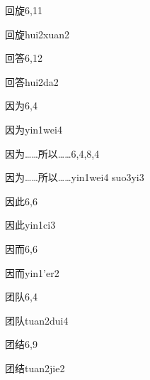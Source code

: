 \begin{entry}{回旋}{6,11}
  \begin{phonetics}{回旋}{hui2xuan2}
  \end{phonetics}
\end{entry}

\begin{entry}{回答}{6,12}
  \begin{phonetics}{回答}{hui2da2}
  \end{phonetics}
\end{entry}

\begin{entry}{因为}{6,4}
  \begin{phonetics}{因为}{yin1wei4}
  \end{phonetics}
\end{entry}

\begin{entry}{因为……所以……}{6,4,8,4}
  \begin{phonetics}{因为……所以……}{yin1wei4 suo3yi3}
  \end{phonetics}
\end{entry}

\begin{entry}{因此}{6,6}
  \begin{phonetics}{因此}{yin1ci3}
  \end{phonetics}
\end{entry}

\begin{entry}{因而}{6,6}
  \begin{phonetics}{因而}{yin1'er2}
  \end{phonetics}
\end{entry}

\begin{entry}{团队}{6,4}
  \begin{phonetics}{团队}{tuan2dui4}
  \end{phonetics}
\end{entry}

\begin{entry}{团结}{6,9}
  \begin{phonetics}{团结}{tuan2jie2}
  \end{phonetics}
\end{entry}

